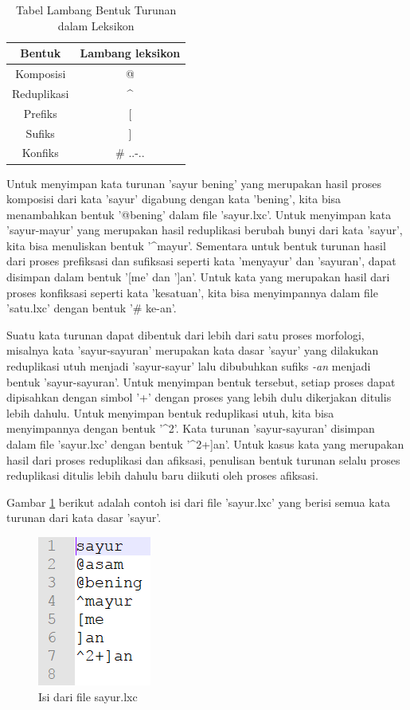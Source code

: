 \begin{table}[H]
\centering
\begin{tabular}{|c|c|}
\hline
\textbf{Bentuk} & \textbf{Lambang leksikon} \\
\hline
Komposisi&@\\
Reduplikasi&\textasciicircum\\
Prefiks&[\\
Sufiks&]\\
Konfiks&\# ..-..\\
\hline
\end{tabular}
\caption{Tabel Lambang Bentuk Turunan dalam Leksikon} 
\label{tabel-lambang-leksikon}
\end{table}

Untuk menyimpan kata turunan 'sayur bening' yang merupakan hasil proses komposisi dari kata 'sayur' digabung dengan kata 'bening', kita bisa menambahkan bentuk '@bening' dalam file 'sayur.lxc'. Untuk menyimpan kata 'sayur-mayur' yang merupakan hasil reduplikasi berubah bunyi dari kata 'sayur', kita bisa menuliskan bentuk '\textasciicircum mayur'. Sementara untuk bentuk turunan hasil dari proses prefiksasi dan sufiksasi seperti kata 'menyayur' dan 'sayuran', dapat disimpan dalam bentuk '[me' dan ']an'. Untuk kata yang merupakan hasil dari proses konfiksasi seperti kata 'kesatuan', kita bisa menyimpannya dalam file 'satu.lxc' dengan bentuk '\# ke-an'.

Suatu kata turunan dapat dibentuk dari lebih dari satu proses morfologi, misalnya kata 'sayur-sayuran' merupakan kata dasar 'sayur' yang dilakukan reduplikasi utuh menjadi 'sayur-sayur' lalu dibubuhkan sufiks \textit{-an} menjadi bentuk 'sayur-sayuran'. Untuk menyimpan bentuk tersebut, setiap proses dapat dipisahkan dengan simbol '+' dengan proses yang lebih dulu dikerjakan ditulis lebih dahulu. Untuk menyimpan bentuk reduplikasi utuh, kita bisa menyimpannya dengan bentuk '\textasciicircum 2'. Kata turunan 'sayur-sayuran' disimpan dalam file 'sayur.lxc' dengan bentuk '\textasciicircum 2+]an'. Untuk kasus kata yang merupakan hasil dari proses reduplikasi dan afiksasi, penulisan bentuk turunan selalu proses reduplikasi ditulis lebih dahulu baru diikuti oleh proses afiksasi. 

Gambar \ref{contoh-entri-sayur} berikut adalah contoh isi dari file 'sayur.lxc' yang berisi semua kata turunan dari kata dasar 'sayur'.

\begin{figure}[H]
\centering
\includegraphics[scale=1]{Gambar/contoh-entri-sayur}
\caption{Isi dari file sayur.lxc} 
\label{contoh-entri-sayur}
\end{figure}

